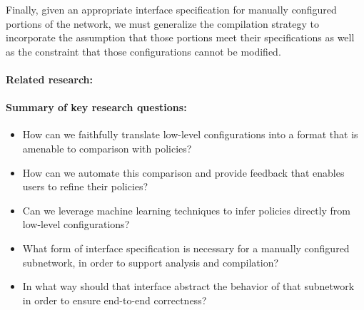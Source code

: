 Finally, given an appropriate interface specification for manually configured portions of the network, we must generalize the \Propane compilation strategy to incorporate the assumption that those portions meet their specifications as well as the constraint that those configurations cannot be modified.


\paragraph*{Related research:}  


\paragraph*{Summary of key research questions:}

\begin{itemize}
\item How can we faithfully translate low-level configurations into a format that is amenable to comparison with \Propane policies?

\item How can we automate this comparison and provide feedback that enables users to refine their policies?

\item Can we leverage machine learning techniques to infer \Propane policies directly from low-level configurations?

\item What form of interface specification is necessary for a manually configured subnetwork, in order to support \Propane analysis and compilation?

\item In what way should that interface abstract the behavior of that subnetwork in order to ensure end-to-end correctness?

\end{itemize}


